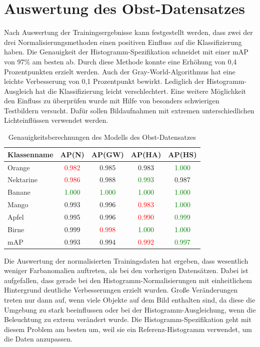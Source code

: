\section{Auswertung des Obst-Datensatzes}
Nach Auswertung der Trainingsergebnisse kann festgestellt werden, dass zwei der drei Normalisierungsmethoden einen positiven Einfluss auf die Klassifizierung haben. 
Die Genauigkeit der Histogramm-Spezifikation schneidet mit einer mAP von 97\% am besten ab. Durch diese Methode konnte eine Erhöhung von 0,4 Prozentpunkten erzielt werden. Auch der Gray-World-Algorithmus hat eine leichte Verbesserung von 0,1 Prozentpunkt bewirkt. Lediglich der Histogramm-Ausgleich hat die Klassifizierung leicht verschlechtert. Eine weitere Möglichkeit den Einfluss zu überprüfen wurde mit Hilfe von besonders schwierigen Testbildern versucht. Dafür sollen Bildaufnahmen mit extremen unterschiedlichen Lichteinflüssen verwendet werden.
\begin{table}
[h]
\caption{Genauigkeitsberechnungen des Modells des Obst-Datensatzes}
\centering
\begin{tabular}{|l|c|c|c|c|}
\hline
Klassenname & AP(N) & AP(GW) & AP(HA) & AP(HS)\\
\hline
Orange & \textcolor{red}{0.982} & 0.985 & 0.983 & \textcolor{green}{1.000}\\
Nektarine & \textcolor{red}{0.986} & 0.988 & \textcolor{green}{0.993} & 0.987\\
Banane & \textcolor{green}{1.000} & \textcolor{green}{1.000} & \textcolor{green}{1.000} & \textcolor{green}{1.000}\\
Mango & 0.993 & 0.996 & \textcolor{red}{0.983} & \textcolor{green}{1.000}\\
Apfel & 0.995 & 0.996 & \textcolor{red}{0.990} & \textcolor{green}{0.999}\\
Birne & 0.999 & \textcolor{red}{0.998} & \textcolor{green}{1.000} & \textcolor{green}{1.000}\\
\hline
mAP & 0.993 & 0.994 & \textcolor{red}{0.992} & \textcolor{green}{0.997}\\
\hline
\end{tabular}
\end{table}
Die Auswertung der normalisierten Trainingsdaten hat ergeben, dass wesentlich weniger Farbanomalien auftreten, als bei den vorherigen Datensätzen. Dabei ist aufgefallen, dass gerade bei den Histogramm-Normalisierungen mit einheitlichem Hintergrund deutliche Verbesserungen erzielt wurden. Große Veränderungen treten nur dann auf, wenn viele Objekte auf dem Bild enthalten sind, da diese die Umgebung zu stark beeinflussen oder bei der Histogramm-Ausgleichung, wenn die Beleuchtung zu extrem verändert wurde. Die Histogramm-Spezifikation geht mit diesem Problem am besten um, weil sie ein Referenz-Histogramm verwendet, um die Daten anzupassen. \\
